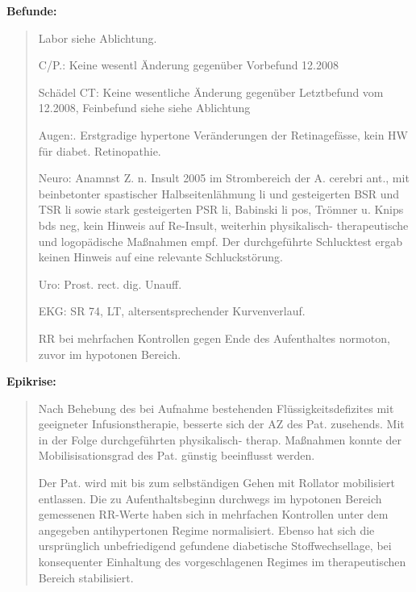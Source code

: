 {{\bfseries Befunde:}
\begin{quote}
Labor siehe Ablichtung.

C/P.: Keine wesentl Änderung
gegenüber Vorbefund 12.2008

Schädel CT: Keine wesentliche Änderung gegenüber Letztbefund vom 12.2008,
Feinbefund siehe siehe Ablichtung

Augen:. Erstgradige hypertone Veränderungen der
Retinagefässe, kein HW für
diabet. Retinopathie.

Neuro: Anamnst Z. n. Insult 2005 im Strombereich der A. cerebri ant., mit
beinbetonter spastischer Halbseitenlähmung li und gesteigerten
BSR und TSR li
sowie stark gesteigerten PSR li, Babinski li pos, Trömner u. Knips bds neg, kein Hinweis auf
Re-Insult, weiterhin physi\-ka\-lisch- thera\-peutische und logopädische
Maßnahmen empf. Der durchgeführte Schlucktest ergab keinen Hinweis auf eine relevante Schluckstörung.

Uro: Prost. rect. dig. Unauff.

EKG: SR 74, LT,
altersentsprechender Kurvenverlauf.

RR bei mehrfachen Kontrollen gegen Ende des Aufenthaltes normoton, zuvor im
hypotonen Bereich.
\end{quote}




{\bfseries Epikrise:}

\begin{quote}
  Nach Behebung des bei Aufnahme bestehenden Flüssigkeitsdefizites mit
  geeigneter Infusionstherapie, besserte sich der AZ des Pat. zusehends. Mit in der Folge
  durchgeführten physi\-ka\-lisch- therap. Maßnahmen konnte der
  Mobilisisationsgrad des Pat. günstig beeinflusst werden.
  
Der Pat. wird mit bis zum selbständigen Gehen mit Rollator mobilisiert entlassen.
Die zu Aufenthaltsbeginn durchwegs im hypotonen Bereich gemessenen RR-Werte haben
sich in mehrfachen Kontrollen unter dem angegeben antihypertonen Regime
normalisiert. Ebenso hat sich die ursprünglich unbefriedigend gefundene
diabetische Stoffwechsellage, bei konsequenter Einhaltung des vorgeschlagenen
Regimes im therapeutischen Bereich stabilisiert.


\end{quote}}
